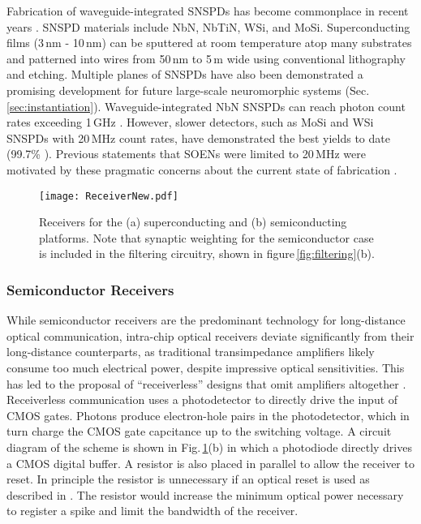 \documentclass[twocolumn]{article}
\begin{document}
Fabrication of waveguide-integrated SNSPDs has become commonplace in recent years \cite{spga2011,pesc2012,akhlaghi2015waveguide,feka2015,saga2015,shbu2017b,ferrari2018waveguide,buta2020}. SNSPD materials include NbN, NbTiN, WSi, and MoSi. Superconducting films (3\,nm - 10\,nm) can be sputtered at room temperature atop many substrates and patterned into wires from 50\,nm to 5\,\textmu m wide using conventional lithography and etching. Multiple planes of SNSPDs have also been demonstrated \cite{vema2012}\textemdash a promising development for future large-scale neuromorphic systems (Sec.\,\ref{sec:instantiation}). Waveguide-integrated NbN SNSPDs can reach photon count rates exceeding 1\,GHz \cite{rosenberg2013high,vetter2016cavity}. However, slower detectors, such as MoSi and WSi SNSPDs with 20\,MHz count rates, have demonstrated the best yields to date (99.7\% \cite{wove2019}). Previous statements that SOENs were limited to 20\,MHz were motivated by these pragmatic concerns about the current state of fabrication \cite{shainline2019superconducting}.

\begin{figure}[!h]
    \centering
    \texttt{[image: ReceiverNew.pdf]}
    \caption{Receivers for the (a) superconducting and (b) semiconducting platforms. Note that synaptic weighting for the semiconductor case is included in the filtering circuitry, shown in figure\,\ref{fig:filtering}(b).}
    \label{fig:sup_synapse}
\end{figure}

\subsubsection{Semiconductor Receivers}
While semiconductor receivers are the predominant technology for long-distance optical communication, intra-chip optical receivers deviate significantly from their long-distance counterparts, as traditional transimpedance amplifiers likely consume too much electrical power, despite impressive optical sensitivities. This has led to the proposal of ``receiverless'' designs that omit amplifiers altogether \cite{miller2017attojoule}. Receiverless communication uses a photodetector to directly drive the input of CMOS gates. Photons produce electron-hole pairs in the photodetector, which in turn charge the CMOS gate capcitance up to the switching voltage. A circuit diagram of the scheme is shown in Fig.\,\ref{fig:sup_synapse}(b) in which a photodiode directly drives a CMOS digital buffer. A resistor is also placed in parallel to allow the receiver to reset. In principle the resistor is unnecessary if an optical reset is used as described in \cite{debaes2003receiver}. The resistor would increase the minimum optical power necessary to register a spike and limit the bandwidth of the receiver. 
\end{document}
